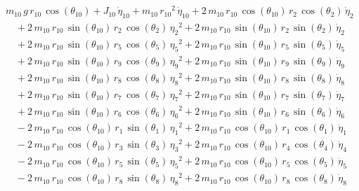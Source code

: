 \begin{eqnarray*} && m_{10}\,g\,r_{10}\,\cos({\theta_{10}}) + J_{10}\,
{\dot{\eta}_{10}} + m_{10}\,{r_{10}}^2\,{\dot{\eta}_{10}} + 2\,m_{10}
\,r_{10}\,\cos({\theta_{10}})\,r_{2}\,\cos({\theta_{2}})\,{\dot{\eta}
_{2}} \\ &&\quad\mbox{} + 2\,m_{10}\,r_{10}\,\sin({\theta_{10}})\,r_{2
}\,\cos({\theta_{2}})\,{{\eta_{2}}}^2 + 2\,m_{10}\,r_{10}\,\sin({
\theta_{10}})\,r_{2}\,\sin({\theta_{2}})\,{\dot{\eta}_{2}}
 \\ &&\quad\mbox{} + 2\,m_{10}\,r_{10}\,\sin({\theta_{10}})\,r_{5}\,
\cos({\theta_{5}})\,{{\eta_{5}}}^2 + 2\,m_{10}\,r_{10}\,\sin({\theta_{
10}})\,r_{5}\,\sin({\theta_{5}})\,{\dot{\eta}_{5}} \\ &&\quad\mbox{}
 + 2\,m_{10}\,r_{10}\,\sin({\theta_{10}})\,r_{9}\,\cos({\theta_{9}})\,
{{\eta_{9}}}^2 + 2\,m_{10}\,r_{10}\,\sin({\theta_{10}})\,r_{9}\,\sin({
\theta_{9}})\,{\dot{\eta}_{9}} \\ &&\quad\mbox{} + 2\,m_{10}\,r_{10}\,
\sin({\theta_{10}})\,r_{8}\,\cos({\theta_{8}})\,{{\eta_{8}}}^2 + 2\,m
_{10}\,r_{10}\,\sin({\theta_{10}})\,r_{8}\,\sin({\theta_{8}})\,{
\dot{\eta}_{8}} \\ &&\quad\mbox{} + 2\,m_{10}\,r_{10}\,\sin({\theta_{
10}})\,r_{7}\,\cos({\theta_{7}})\,{{\eta_{7}}}^2 + 2\,m_{10}\,r_{10}\,
\sin({\theta_{10}})\,r_{7}\,\sin({\theta_{7}})\,{\dot{\eta}_{7}}
 \\ &&\quad\mbox{} + 2\,m_{10}\,r_{10}\,\sin({\theta_{10}})\,r_{6}\,
\cos({\theta_{6}})\,{{\eta_{6}}}^2 + 2\,m_{10}\,r_{10}\,\sin({\theta_{
10}})\,r_{6}\,\sin({\theta_{6}})\,{\dot{\eta}_{6}} \\ &&\quad\mbox{}
 - 2\,m_{10}\,r_{10}\,\cos({\theta_{10}})\,r_{1}\,\sin({\theta_{1}})\,
{{\eta_{1}}}^2 + 2\,m_{10}\,r_{10}\,\cos({\theta_{10}})\,r_{1}\,\cos({
\theta_{1}})\,{\dot{\eta}_{1}} \\ &&\quad\mbox{} - 2\,m_{10}\,r_{10}\,
\cos({\theta_{10}})\,r_{3}\,\sin({\theta_{3}})\,{{\eta_{3}}}^2 + 2\,m
_{10}\,r_{10}\,\cos({\theta_{10}})\,r_{4}\,\cos({\theta_{4}})\,{
\dot{\eta}_{4}} \\ &&\quad\mbox{} - 2\,m_{10}\,r_{10}\,\cos({\theta_{
10}})\,r_{5}\,\sin({\theta_{5}})\,{{\eta_{5}}}^2 + 2\,m_{10}\,r_{10}\,
\cos({\theta_{10}})\,r_{5}\,\cos({\theta_{5}})\,{\dot{\eta}_{5}}
 \\ &&\quad\mbox{} - 2\,m_{10}\,r_{10}\,\cos({\theta_{10}})\,r_{8}\,
\sin({\theta_{8}})\,{{\eta_{8}}}^2 + 2\,m_{10}\,r_{10}\,\cos({\theta_{
10}})\,r_{8}\,\cos({\theta_{8}})\,{\dot{\eta}_{8}} \\ &&\quad\mbox{}

\end{eqnarray*}
